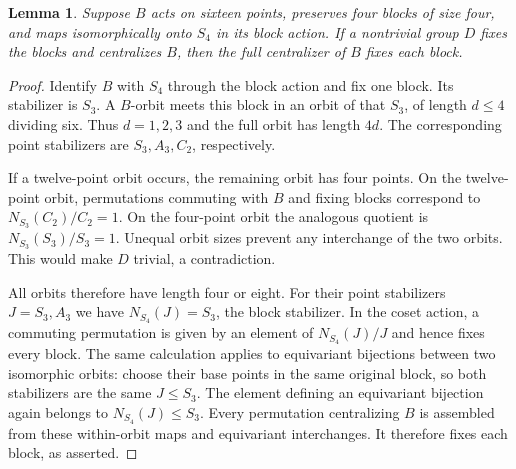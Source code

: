 \documentclass[11pt,a4paper]{article}
\newtheorem{lemma}[theorem]{Lemma}
\begin{document}
\begin{lemma}\label{fourfaithful}
Suppose $B$ acts on sixteen points, preserves four blocks of size four,
and maps isomorphically onto $S_4$ in its block action. If a nontrivial
group $D$ fixes the blocks and centralizes $B$, then the full centralizer
of $B$ fixes each block.
\end{lemma}
\begin{proof}
Identify $B$ with $S_4$ through the block action and fix one block.
Its stabilizer is $S_3$. A $B$-orbit meets this block in an orbit of that
$S_3$, of length $d\le4$ dividing six. Thus $d=1,2,3$ and the full
orbit has length $4d$. The corresponding point stabilizers are
$S_3,A_3,C_2$, respectively.

If a twelve-point orbit occurs, the remaining orbit has four points.
On the twelve-point orbit, permutations commuting with $B$ and fixing
blocks correspond to $N_{S_3}(C_2)/C_2=1$. On the four-point orbit
the analogous quotient is $N_{S_3}(S_3)/S_3=1$. Unequal orbit sizes
prevent any interchange of the two orbits. This would make $D$ trivial,
a contradiction.

All orbits therefore have length four or eight. For their point
stabilizers $J=S_3,A_3$ we have $N_{S_4}(J)=S_3$, the block stabilizer.
In the coset action, a commuting permutation is given by an element of
$N_{S_4}(J)/J$ and hence fixes every block. The same calculation applies
to equivariant bijections between two isomorphic orbits: choose their
base points in the same original block, so both stabilizers are the
same $J\le S_3$. The element defining an equivariant bijection again
belongs to $N_{S_4}(J)\le S_3$. Every permutation centralizing $B$ is
assembled from these within-orbit maps and equivariant interchanges.
It therefore fixes each block, as asserted.
\end{proof}
\end{document}

